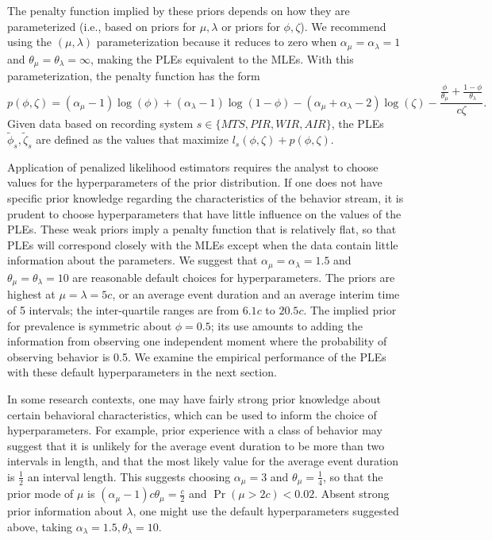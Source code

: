 \documentclass[man, noextraspace, floatsintext]{apa6}\usepackage[]{graphicx}\usepackage[]{color}
\begin{document}
The penalty function implied by these priors depends on how they are parameterized (i.e., based on priors for $\mu, \lambda$ or priors for $\phi, \zeta$). We recommend using the $\left(\mu,\lambda\right)$ parameterization because it reduces to zero when $\alpha_\mu = \alpha_\lambda = 1$ and $\theta_\mu = \theta_\lambda = \infty$, making the PLEs equivalent to the MLEs.
With this parameterization, the penalty function has the form 
\begin{equation}
p\left(\phi, \zeta\right) = \left(\alpha_\mu - 1\right) \log \left(\phi\right) + \left(\alpha_\lambda - 1\right) \log \left(1 - \phi\right) - \left(\alpha_\mu + \alpha_\lambda - 2\right) \log\left(\zeta\right) - \frac{\frac{\phi}{\theta_\mu} + \frac{1-\phi}{\theta_\lambda}}{c \zeta}.
\end{equation}
Given data based on recording system $s \in \{MTS, PIR, WIR, AIR\}$, the PLEs $\tilde\phi_s, \tilde\zeta_s$ are defined as the values that maximize $l_s\left(\phi, \zeta\right) + p\left(\phi, \zeta\right)$. 



Application of penalized likelihood estimators requires the analyst to choose values for the hyperparameters of the prior distribution. If one does not have specific prior knowledge regarding the characteristics of the behavior stream, it is prudent to choose hyperparameters that have little influence on the values of the PLEs. These weak priors imply a penalty function that is relatively flat, so that PLEs will correspond closely with the MLEs except when the data contain little information about the parameters. We suggest that $\alpha_\mu = \alpha_\lambda = 1.5$ and $\theta_\mu = \theta_\lambda = 10$ are reasonable default choices for hyperparameters. The priors are highest at $\mu = \lambda = 5 c$, or an average event duration and an average interim time of 5 intervals; the inter-quartile ranges are from $6.1 c$ to $20.5 c$. The implied prior for prevalence is symmetric about $\phi = 0.5$; its use amounts to adding the information from observing one independent moment where the probability of observing behavior is 0.5. We examine the empirical performance of the PLEs with these default hyperparameters in the next section.



In some research contexts, one may have fairly strong prior knowledge about certain behavioral characteristics, which can be used to inform the choice of hyperparameters. 
For example, prior experience with a class of behavior may suggest that it is unlikely for the average event duration to be more than two intervals in length, and that the most likely value for the average event duration is $\frac{1}{2}$ an interval length. 
This suggests choosing $\alpha_\mu = 3$ and $\theta_\mu = \frac{1}{4}$, so that the prior mode of $\mu$ is $\left(\alpha_\mu - 1\right) c \theta_\mu = \frac{c}{2}$ and $\Pr(\mu > 2c) < 0.02$.
Absent strong prior information about $\lambda$, one might use the default hyperparameters suggested above, taking $\alpha_\lambda = 1.5, \theta_\lambda = 10$. 
\end{document}
